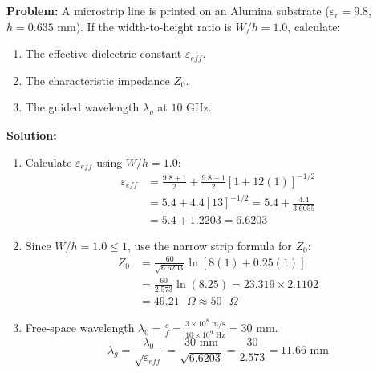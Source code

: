\documentclass[10pt,a4paper]{article}
\begin{document}
\begin{tcolorbox}[examplebox, title={Worked Numerical: Microstrip Design \& Wavelength Calculation}]
  \textbf{Problem:} A microstrip line is printed on an Alumina substrate ($\varepsilon_r = 9.8$, $h = 0.635\text{ mm}$). If the width-to-height ratio is $W/h = 1.0$, calculate:
  \begin{enumerate}[label=(\alph*), noitemsep]
    \item The effective dielectric constant $\varepsilon_{eff}$.
    \item The characteristic impedance $Z_0$.
    \item The guided wavelength $\lambda_g$ at $10\text{ GHz}$.
  \end{enumerate}
  \tcblower
  \textbf{Solution:}
  \begin{enumerate}[label=(\alph*), itemsep=4pt]
    \item Calculate $\varepsilon_{eff}$ using $W/h = 1.0$:
      \begin{equation}
        \begin{aligned}
          \varepsilon_{eff} &= \frac{9.8 + 1}{2} + \frac{9.8 - 1}{2} \left[ 1 + 12(1) \right]^{-1/2} \\
          &= 5.4 + 4.4 \left[ 13 \right]^{-1/2} = 5.4 + \frac{4.4}{3.6055} \\
          &= 5.4 + 1.2203 = 6.6203
        \end{aligned}
      \end{equation}
    \item Since $W/h = 1.0 \le 1$, use the narrow strip formula for $Z_0$:
      \begin{equation}
        \begin{aligned}
          Z_0 &= \frac{60}{\sqrt{6.6203}} \ln\left[ 8(1) + 0.25(1) \right] \\
          &= \frac{60}{2.573} \ln(8.25) = 23.319 \times 2.1102 \\
          &= 49.21\text{ }\Omega \approx 50\text{ }\Omega
        \end{aligned}
      \end{equation}
    \item Free-space wavelength $\lambda_0 = \frac{c}{f} = \frac{3 \times 10^8\text{ m/s}}{10 \times 10^9\text{ Hz}} = 30\text{ mm}$.
      \begin{equation}
        \lambda_g = \frac{\lambda_0}{\sqrt{\varepsilon_{eff}}} = \frac{30\text{ mm}}{\sqrt{6.6203}} = \frac{30}{2.573} = 11.66\text{ mm}
      \end{equation}
  \end{enumerate}
\end{tcolorbox}
\end{document}
